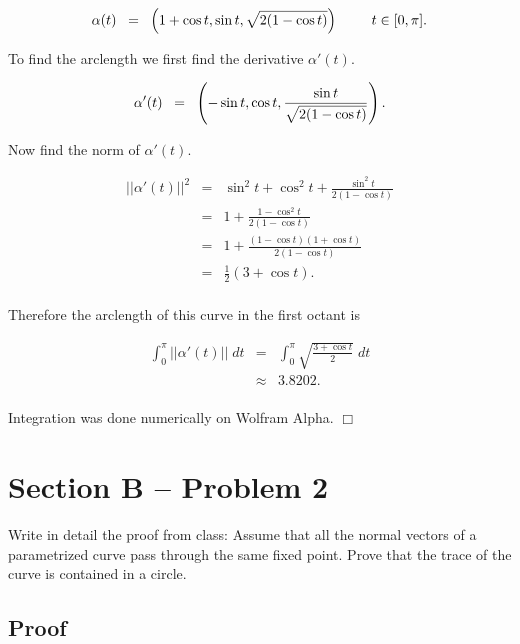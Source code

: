 \documentclass{article}
\begin{document}
\begin{equation*}
\alpha(t) \;\; = \;\;\left (1+ \cos t, \sin t, \sqrt{2(1 - \cos t)} \right ) \hspace{2pc} t \in [0, \pi]. \\
\end{equation*}

\noindent To find the arclength we first find the derivative $\alpha'(t)$.

\begin{equation*}
\alpha'(t) \;\; = \;\; \left ( - \sin t, \cos t, \frac{\sin t}{\sqrt{2(1 - \cos t)}} \right ). \\
\end{equation*}

\noindent Now find the norm of $\alpha'(t)$.

\begin{eqnarray*}
||\alpha'(t)||^2 & = & \sin^2t + \cos^2t + \frac{\sin^2t}{2(1 - \cos t)} \\
& = & 1 + \frac{1 - \cos^2t}{2(1 - \cos t)} \\
&  = & 1 + \frac{(1- \cos t)(1+ \cos t)}{2(1 - \cos t)} \\ 
& =  & \frac{1}{2}(3 + \cos t). \\
\end{eqnarray*}

\noindent Therefore the arclength of this curve in the first octant is 

\begin{eqnarray*}
\int_0^\pi ||\alpha'(t)|| \; dt & = & \int_0^\pi \sqrt{ \frac{3 + \cos t}{2}} \; dt \\
& \approx & 3.8202. \\
\end{eqnarray*}

\noindent Integration was done numerically on Wolfram Alpha.  \hfill $\Box$


\section*{Section B -- Problem 2}

\noindent Write in detail the proof from class: Assume that all the normal vectors of a parametrized curve pass through the same fixed point.  Prove that the trace of the curve is contained in a circle.  

\subsection*{Proof}
\end{document}
